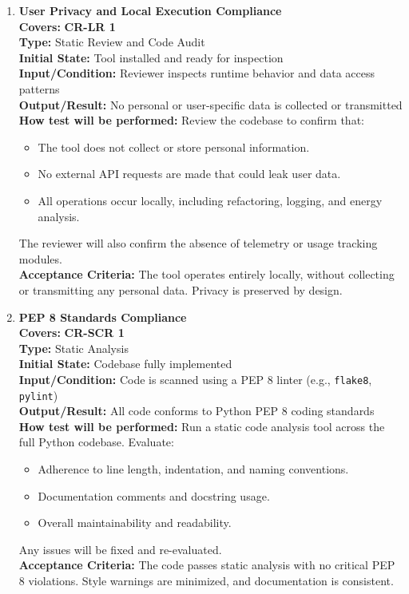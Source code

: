 \documentclass[12pt, titlepage]{article}
\begin{document}
\begin{enumerate}[label={\bf \textcolor{Maroon}{test-CPL-\arabic*}}, wide=0pt, font=\itshape]

  \item \textbf{User Privacy and Local Execution Compliance} \\[2mm]
    \textbf{Covers:} \textbf{CR-LR 1} \\
    \textbf{Type:} Static Review and Code Audit \\
    \textbf{Initial State:} Tool installed and ready for inspection \\
    \textbf{Input/Condition:} Reviewer inspects runtime behavior and data access patterns \\
    \textbf{Output/Result:} No personal or user-specific data is collected or transmitted \\[2mm]
    \textbf{How test will be performed:} Review the codebase to confirm that:
    \begin{itemize}
      \item The tool does not collect or store personal information.
      \item No external API requests are made that could leak user data.
      \item All operations occur locally, including refactoring, logging, and energy analysis.
    \end{itemize}
    The reviewer will also confirm the absence of telemetry or usage tracking modules. \\[2mm]
    \textbf{Acceptance Criteria:} The tool operates entirely locally, without collecting or transmitting any personal data. Privacy is preserved by design.

  \item \textbf{PEP 8 Standards Compliance} \\[2mm]
    \textbf{Covers:} \textbf{CR-SCR 1} \\
    \textbf{Type:} Static Analysis \\
    \textbf{Initial State:} Codebase fully implemented \\
    \textbf{Input/Condition:} Code is scanned using a PEP 8 linter (e.g., \texttt{flake8}, \texttt{pylint}) \\
    \textbf{Output/Result:} All code conforms to Python PEP 8 coding standards \\[2mm]
    \textbf{How test will be performed:} Run a static code analysis tool across the full Python codebase. Evaluate:
    \begin{itemize}
      \item Adherence to line length, indentation, and naming conventions.
      \item Documentation comments and docstring usage.
      \item Overall maintainability and readability.
    \end{itemize}
    Any issues will be fixed and re-evaluated. \\[2mm]
    \textbf{Acceptance Criteria:} The code passes static analysis with no critical PEP 8 violations. Style warnings are minimized, and documentation is consistent.

\end{enumerate}
\end{document}

